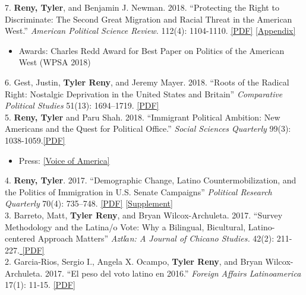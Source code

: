 \documentclass[11pt, a4paper]{article}
\newcommand{\years}[1]{\marginnote{\scriptsize #1}}
\begin{document}
\years{2018} 7. \textbf{Reny, Tyler}, and Benjamin J. Newman. 2018. ``Protecting the Right to Discriminate: The Second Great Migration and Racial Threat in the American West.'' \textit{American Political Science Review.} 112(4): 1104-1110. \href{http://tylerreny.github.io/pdf/pubs/reny_newman_apsr_2018.pdf}{[PDF]} \href{http://tylerreny.github.io/pdf/pubs/reny_newman_apsr_2018_SI.pdf}{[Appendix]}
\begin{itemize}
  \item Awards: Charles Redd Award for Best Paper on Politics of the American West (WPSA 2018)
\end{itemize}

\years{} 6. Gest, Justin, \textbf{Tyler Reny}, and Jeremy Mayer. 2018. ``Roots of the Radical Right: Nostalgic Deprivation in the United States and Britain'' \textit{Comparative Political Studies} 51(13): 1694–1719. \href{http://tylerreny.github.io/pdf/pubs/reny_2017_cps_final.pdf}{[PDF]}\\

\years{} 5. \textbf{Reny, Tyler} and Paru Shah. 2018. ``Immigrant Political Ambition:  New Americans and the Quest for Political Office.'' \textit{Social Sciences Quarterly} 99(3): 1038-1059.\href{http://tylerreny.github.io/pdf/pubs/reny_shah_2018_ssq_immigrant_ambition.pdf}{[PDF]} 

\begin{itemize}
\item Press: \href{https://www.voanews.com/a/immigrants-candidates-make-a-run-for-it-in-upcoming-us-elections/4439132.html}{[Voice of America]}
\end{itemize}

\years{2017} 4. \textbf{Reny, Tyler}. 2017. ``Demographic Change, Latino Countermobilization, and the Politics of Immigration in U.S. Senate Campaigns'' \textit{Political Research Quarterly} 70(4): 735–748. \href{http://tylerreny.github.io/pdf/pubs/reny_2017_prq_final.pdf}{[PDF]} \href{http://tylerreny.github.io/pdf/pubs/reny_2017_prq_final_supp.pdf}{[Supplement]}\\

\years{} 3. Barreto, Matt, \textbf{Tyler Reny}, and Bryan Wilcox-Archuleta. 2017. ``Survey Methodology and the Latina/o Vote: Why a Bilingual, Bicultural, Latino-centered Approach Matters'' \textit{Aztl$\acute{a}$n: A Journal of Chicano Studies.} 42(2): 211-227.\href{http://tylerreny.github.io/pdf/pubs/reny_2017_aztlan_final.pdf}{ [PDF]}\\

\years{} 2. Garcia-Rios, Sergio I., Angela X. Ocampo, \textbf{Tyler Reny}, and Bryan Wilcox-Archuleta. 2017. ``El peso del voto latino en 2016.'' \textit{Foreign Affairs Latinoamerica} 17(1): 11-15. \href{http://tylerreny.github.io/pdf/pubs/reny_et_al_2017_foreign_affairs.pdf}{ [PDF]}\\
\end{document}
